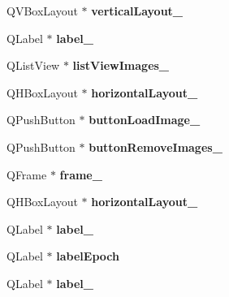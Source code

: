 \begin{DoxyCompactItemize}
Q\+V\+Box\+Layout $\ast$ {\bfseries vertical\+Layout\+\_}
\item 
\mbox{\label{class_ui___main_form_add8242e598f993dbd317ef48fa5345e5}} 
Q\+Label $\ast$ {\bfseries label\+\_}
\item 
\mbox{\label{class_ui___main_form_aa052a1eb09d95e9215811e321f9c1851}} 
Q\+List\+View $\ast$ {\bfseries list\+View\+Images\+\_}
\item 
\mbox{\label{class_ui___main_form_a71b30d7fe84b82e739a35966031a11fb}} 
Q\+H\+Box\+Layout $\ast$ {\bfseries horizontal\+Layout\+\_}
\item 
\mbox{\label{class_ui___main_form_a4bf32fbe837595bcba02bd0d28161ab0}} 
Q\+Push\+Button $\ast$ {\bfseries button\+Load\+Image\+\_}
\item 
\mbox{\label{class_ui___main_form_a027a0485ad4384e14ef63155f614d454}} 
Q\+Push\+Button $\ast$ {\bfseries button\+Remove\+Images\+\_}
\item 
\mbox{\label{class_ui___main_form_a11ed09412bd857f442334ccc9c0ed67e}} 
Q\+Frame $\ast$ {\bfseries frame\+\_}
\item 
\mbox{\label{class_ui___main_form_a0512b7215cd9c144ed973ff7c748d856}} 
Q\+H\+Box\+Layout $\ast$ {\bfseries horizontal\+Layout\+\_}
\item 
\mbox{\label{class_ui___main_form_a0ce766dbf5d60dbff2f84b41a76c396e}} 
Q\+Label $\ast$ {\bfseries label\+\_}
\item 
\mbox{\label{class_ui___main_form_a023d8801d8d9c4309772d9256ed1050d}} 
Q\+Label $\ast$ {\bfseries label\+Epoch}
\item 
\mbox{\label{class_ui___main_form_a69b022e9d0e5cc87a1cf8b2a4cda3bdc}} 
Q\+Label $\ast$ {\bfseries label\+\_}
\item 
\mbox{\label{class_ui___main_form_aab01e3b8041f2a8ebf48267a7e0a65c2}} 

\end{DoxyCompactItemize}
